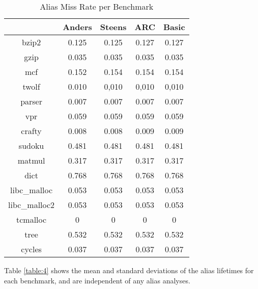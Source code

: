 \begin{table} [h!]
\centering
   \begin{tabular} {|c|c c c c|}
      \hline
      & Anders & Steens & ARC & Basic \\
      \hline
	   bzip2 & 0.125 & 0.125 & 0.127 & 0.127 \\
      \hline
	   gzip & 0.035 & 0.035 & 0.035 & 0.035 \\
      \hline
           mcf & 0.152 & 0.154 & 0.154 & 0.154 \\
      \hline
	   twolf & 0.010 & 0,010 & 0,010 & 0,010 \\
      \hline
	   parser & 0.007 & 0.007 & 0.007 & 0.007 \\
      \hline
	   vpr & 0.059 & 0.059 & 0.059 & 0.059 \\
      \hline
	   crafty & 0.008 & 0.008 & 0.009 & 0.009 \\
      \hline
	   sudoku & 0.481 & 0.481 & 0.481 & 0.481 \\
      \hline
	   matmul & 0.317 & 0.317 & 0.317 & 0.317 \\
      \hline
	   dict & 0.768 & 0.768 & 0.768 & 0.768 \\
      \hline
	   libc\_malloc & 0.053 & 0.053 & 0.053 & 0.053 \\
      \hline
	   libc\_malloc2 & 0.053 & 0.053 & 0.053 & 0.053 \\
      \hline
	   tcmalloc & 0 & 0 & 0 & 0 \\
      \hline
	   tree & 0.532 & 0.532 & 0.532 & 0.532 \\
      \hline
	   cycles & 0.037 & 0.037 & 0.037 & 0.037 \\
      \hline
   \end{tabular}
   \caption{Alias Miss Rate per Benchmark}
   \label{table:3}
\end{table}

\newpage

Table \ref{table:4} shows the mean and standard deviations of the alias lifetimes for each benchmark, and are independent of any alias analyses.

